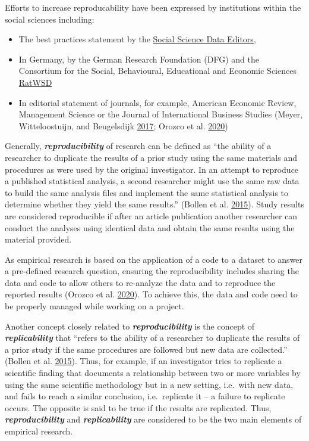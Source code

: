 \documentclass[
]{book}
\providecommand{\tightlist}{%
  \setlength{\itemsep}{0pt}\setlength{\parskip}{0pt}}
\begin{document}
Efforts to increase reproducability have been expressed by institutions
within the social sciences including:

\begin{itemize}
\tightlist
\item
  The best practices statement by the
  \href{https://social-science-data-editors.github.io/template_README/}{Social
  Science Data Editors},
\item
  In Germany, by the German Research Foundation (DFG) and the Consortium
  for the Social, Behavioural, Educational and Economic Sciences
  \href{https://www.ratswd.de/en/publikationen/output}{RatWSD}
\item
  In editorial statement of journals, for example, American Economic
  Review, Management Science or the Journal of International Business
  Studies (Meyer, Witteloostuijn, and Beugelsdijk
  \protect\hyperlink{ref-meyer_whats_2017}{2017}; Orozco et al.
  \protect\hyperlink{ref-orozco_how_2020}{2020})
\end{itemize}

Generally, \textbf{\emph{reproducibility}} of research can be defined as
``the ability of a researcher to duplicate the results of a prior study
using the same materials and procedures as were used by the original
investigator. In an attempt to reproduce a published statistical
analysis, a second researcher might use the same raw data to build the
same analysis files and implement the same statistical analysis to
determine whether they yield the same results.'' (Bollen et al.
\protect\hyperlink{ref-bollen_social_2015}{2015}). Study results are
considered reproducible if after an article publication another
researcher can conduct the analyses using identical data and obtain the
same results using the material provided.

As empirical research is based on the application of a code to a dataset
to answer a pre-defined research question, ensuring the reproducibility
includes sharing the data and code to allow others to re-analyze the
data and to reproduce the reported results (Orozco et al.
\protect\hyperlink{ref-orozco_how_2020}{2020}). To achieve this, the
data and code need to be properly managed while working on a project.

Another concept closely related to \textbf{\emph{reproducibility}} is
the concept of \textbf{\emph{replicability}} that ``refers to the
ability of a researcher to duplicate the results of a prior study if the
same procedures are followed but new data are collected.'' (Bollen et
al. \protect\hyperlink{ref-bollen_social_2015}{2015}). Thus, for
example, if an investigator tries to replicate a scientific finding that
documents a relationship between two or more variables by using the same
scientific methodology but in a new setting, i.e.~with new data, and
fails to reach a similar conclusion, i.e.~replicate it -- a failure to
replicate occurs. The opposite is said to be true if the results are
replicated. Thus, \textbf{\emph{reproducibility}} and
\textbf{\emph{replicability}} are considered to be the two main elements
of empirical research.
\end{document}

